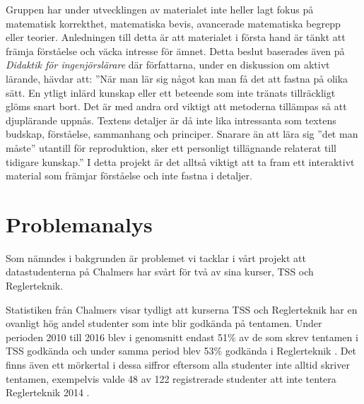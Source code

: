 \documentclass[]{article}
\begin{document}
Gruppen har under utvecklingen av materialet inte heller lagt fokus på matematisk korrekthet,
matematiska bevis, avancerade matematiska begrepp eller teorier.  Anledningen till detta är att
materialet  i första hand är tänkt att främja förståelse och väcka intresse för ämnet. Detta beslut
baserades även på \textit{Didaktik för ingenjörslärare} där författarna, under en diskussion om aktivt lärande,
hävdar att: ”När man lär sig något kan man få det att fastna på olika sätt. En ytligt inlärd kunskap
eller ett beteende som inte tränats tillräckligt glöms snart bort. Det är med andra ord viktigt att
metoderna tillämpas så att djuplärande uppnås. Textens detaljer är då inte lika intressanta som textens
budskap, förståelse, sammanhang och principer. Snarare än att lära sig ”det man måste” utantill för
reproduktion, sker ett personligt tillägnande relaterat till tidigare kunskap.” I detta projekt är det
alltså viktigt att ta fram ett interaktivt material som främjar förståelse och inte fastna i detaljer.

\section{Problemanalys}


Som nämndes i bakgrunden är problemet vi tacklar i vårt projekt att
datastudenterna på Chalmers har svårt för två av sina kurser,
TSS och Reglerteknik.

Statistiken från Chalmers visar tydligt att kurserna TSS och Reglerteknik
har en ovanligt hög andel studenter som inte blir godkända på tentamen.
Under perioden 2010 till 2016 blev i genomsnitt endast 51\% av de som skrev
tentamen i TSS godkända och under samma period blev 53\% godkända i
Reglerteknik \cite{tentastatistik}.
Det finns även ett mörkertal i dessa siffror eftersom alla studenter
inte alltid skriver tentamen, exempelvis valde 48 av 122 registrerade
studenter att inte tentera Reglerteknik 2014
\cite{kursinformation:ere102:14-15}.
\end{document}

